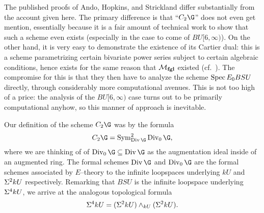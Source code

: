 \begin{remark}\label{CUpper3Exists}
The published proofs of Ando, Hopkins, and Strickland differ substantially from the account given here.  The primary difference is that ``$C_2 \G$'' does not even get mention, essentially because it is a fair amount of technical work to show that such a scheme even exists (especially in the case to come of $BU[6, \infty)$).  On the other hand, it is very easy to demonstrate the existence of its Cartier dual: this is a scheme parametrizing certain bivariate power series subject to certain algebraic conditions, hence exists for the same reason that $\mathcal{M}_{\mathbf{fgl}}$ existed (cf.\ ).  The compromise for this is that they then have to analyze the scheme $\operatorname{Spec} E_0 BSU$ directly, through considerably more computational avenues.  This is not too high of a price: the analysis of the $BU[6, \infty)$ case turns out to be primarily computational anyhow, so this manner of approach is inevitable.
\end{remark}

\begin{remark}
Our definition of the scheme $C_2 \G$ was by the formula \[C_2 \G = \Sym^2_{\Div \G} \Div_0 \G,\] where we are thinking of of $\Div_0 \G \subseteq \Div \G$ as the augmentation ideal inside of an augmented ring.  The formal schemes $\Div \G$ and $\Div_0 \G$ are the formal schemes associated by $E$--theory to the infinite loopspaces underlying $kU$ and $\Sigma^2 kU$ respectively.  Remarking that $BSU$ is the infinite loopspace underlying $\Sigma^4 kU$, we arrive at the analogous topological formula \[\Sigma^4 kU = (\Sigma^2 kU) \wedge_{kU} (\Sigma^2 kU).\]
\end{remark}




